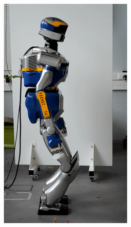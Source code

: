 \begin{figure}
  \centering
  \begin{subfigure}{0.19\columnwidth}
    \centering
    \includegraphics[width = \columnwidth]
                    {src/chap3-optimal-motion-planning/figure/self-collision-1.png}
    \label{self-collision-1}
  \end{subfigure}
  \begin{subfigure}{0.19\columnwidth}
    \centering

\end{subfigure}
\end{figure}
